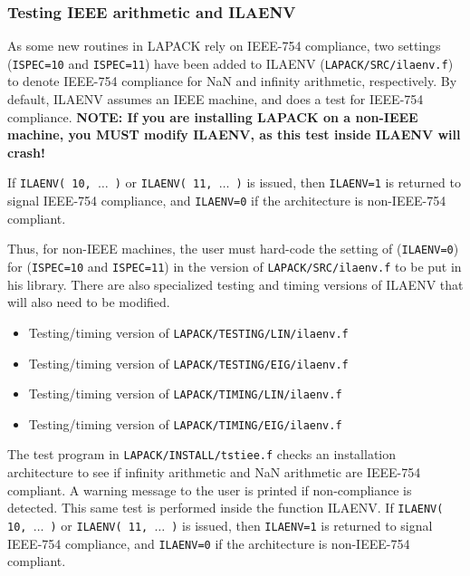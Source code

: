 \subsubsection{Testing IEEE arithmetic and ILAENV}\label{testieee}


As some new routines in LAPACK rely on IEEE-754 compliance,
two settings ({\tt ISPEC=10} and {\tt ISPEC=11}) have been added to ILAENV
({\tt LAPACK/SRC/ilaenv.f}) to denote IEEE-754 compliance for NaN and
infinity arithmetic, respectively.  By default, ILAENV assumes an IEEE
machine, and does a test for IEEE-754 compliance.  {\bf NOTE:  If you
are installing LAPACK on a non-IEEE machine, you MUST modify ILAENV,
as this test inside ILAENV will crash!}

If {\tt ILAENV( 10, $\ldots$ )} or {\tt ILAENV( 11, $\ldots$ )} is 
issued, then {\tt ILAENV=1} is returned to signal IEEE-754 compliance,
and {\tt ILAENV=0} if the architecture is non-IEEE-754 compliant.

Thus, for non-IEEE machines, the user must hard-code the setting of
({\tt ILAENV=0}) for ({\tt ISPEC=10} and {\tt ISPEC=11}) in the version
of {\tt LAPACK/SRC/ilaenv.f} to be put in
his library.  There are also specialized testing and timing versions of
ILAENV that will also need to be modified.
\begin{itemize}
\item Testing/timing version of {\tt LAPACK/TESTING/LIN/ilaenv.f}
\item Testing/timing version of {\tt LAPACK/TESTING/EIG/ilaenv.f}
\item Testing/timing version of {\tt LAPACK/TIMING/LIN/ilaenv.f}
\item Testing/timing version of {\tt LAPACK/TIMING/EIG/ilaenv.f}
\end{itemize}


The test program in {\tt LAPACK/INSTALL/tstiee.f} checks an installation
architecture
to see if infinity arithmetic and NaN arithmetic are IEEE-754 compliant.  
A warning message to the user is printed if non-compliance is detected.
This same test is performed inside the function ILAENV.  If
{\tt ILAENV( 10, $\ldots$ )} or {\tt ILAENV( 11, $\ldots$ )} is 
issued, then {\tt ILAENV=1} is returned to signal IEEE-754 compliance,
and {\tt ILAENV=0} if the architecture is non-IEEE-754 compliant.

